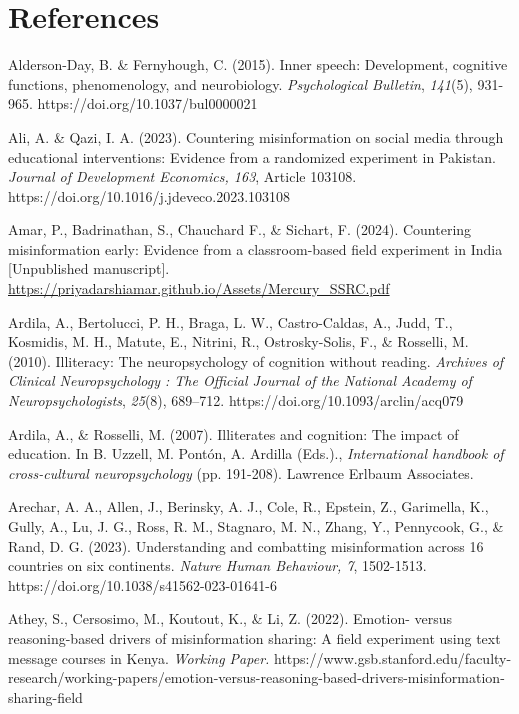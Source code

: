 \documentclass[authordate, empirical]{jote-new-article}
\begin{document}
	\section{References}



	Alderson-Day, B. \& Fernyhough, C. (2015). Inner speech: Development, cognitive functions, phenomenology, and neurobiology. \emph{Psychological Bulletin}, \emph{141}(5), 931-965. https://doi.org/10.1037/bul0000021



	Ali, A. \& Qazi, I. A. (2023). Countering misinformation on social media through educational interventions: Evidence from a randomized experiment in Pakistan. \emph{Journal of Development Economics, 163}, Article 103108. https://doi.org/10.1016/j.jdeveco.2023.103108



	Amar, P., Badrinathan, S., Chauchard F., \& Sichart, F. (2024). Countering misinformation early: Evidence from a classroom-based field experiment in India [Unpublished manuscript]. \href{https://priyadarshiamar.github.io/Assets/Mercury_SSRC.pdf}{https://priyadarshiamar.github.io/Assets/Mercury\_SSRC.pdf}



	Ardila, A., Bertolucci, P. H., Braga, L. W., Castro-Caldas, A., Judd, T., Kosmidis, M. H., Matute, E., Nitrini, R., Ostrosky-Solis, F., \& Rosselli, M. (2010). Illiteracy: The neuropsychology of cognition without reading. \emph{Archives of Clinical Neuropsychology : The Official Journal of the National Academy of Neuropsychologists}, \emph{25}(8), 689--712. https://doi.org/10.1093/arclin/acq079



	Ardila, A., \& Rosselli, M. (2007). Illiterates and cognition: The impact of education. In B. Uzzell, M. Pontón, A. Ardilla (Eds.)., \emph{International handbook of cross-cultural neuropsychology }(pp. 191-208). Lawrence Erlbaum Associates.



	Arechar, A. A., Allen, J., Berinsky, A. J., Cole, R., Epstein, Z., Garimella, K., Gully, A., Lu, J. G., Ross, R. M., Stagnaro, M. N., Zhang, Y., Pennycook, G., \& Rand, D. G. (2023). Understanding and combatting misinformation across 16 countries on six continents. \emph{Nature Human Behaviour, 7}, 1502-1513. https://doi.org/10.1038/s41562-023-01641-6



	Athey, S., Cersosimo, M., Koutout, K., \& Li, Z. (2022). Emotion- versus reasoning-based drivers of misinformation sharing: A field experiment using text message courses in Kenya. \emph{Working Paper. }https://www.gsb.stanford.edu/faculty-research/working-papers/emotion-versus-reasoning-based-drivers-misinformation-sharing-field
\end{document}
